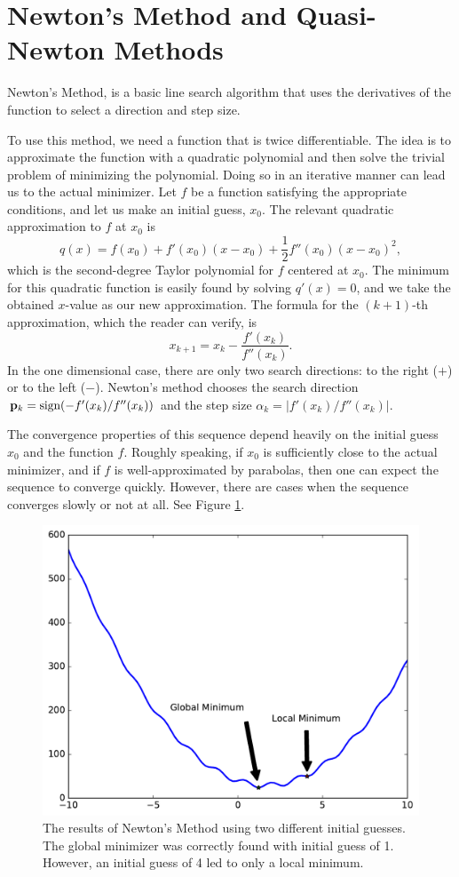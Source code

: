 \section*{Newton's Method and Quasi-Newton Methods} %

Newton's Method, is a basic line search algorithm that uses the derivatives of the function to select a direction and step size.

To use this method, we need a function that is twice differentiable.
The idea is to approximate the function with a quadratic polynomial and then solve the trivial problem of minimizing the polynomial.
Doing so in an iterative manner can lead us to the actual minimizer.
Let $f$ be a function satisfying the appropriate conditions, and let us make an initial guess, $x_0$.
The relevant quadratic approximation to $f$ at $x_0$ is
\begin{equation*}
q(x) = f(x_0) + f'(x_0)(x-x_0) + \frac{1}{2}f''(x_0)(x-x_0)^2,
\end{equation*}
which is the second-degree Taylor polynomial for $f$ centered at $x_0$.
The minimum for this quadratic function is easily found by solving $q'(x) = 0$, and we take the obtained $x$-value as our new approximation.
The formula for the $(k+1)$-th approximation, which the reader can verify, is
\begin{equation*}
x_{k+1} = x_k - \frac{f'(x_k)}{f''(x_k)}.
\end{equation*}
In the one dimensional case, there are only two search directions: to the right ($+$) or to the left ($-$).
Newton's method chooses the search direction $\mathbf{p}_k = \text{sign}(-f'(x_k)/f''(x_k))$ and the step size $\alpha_k = |f'(x_k)/f''(x_k)|$.

The convergence properties of this sequence depend heavily on the initial guess $x_0$ and the function $f$.
Roughly speaking, if $x_0$ is sufficiently close to the actual minimizer, and if $f$ is well-approximated by parabolas, then one can expect the sequence to converge quickly.
However, there are cases when the sequence converges slowly or not at all.
See Figure \ref{linesearch:newton}.

\begin{figure}
\centering
\includegraphics[width=.7\textwidth]{newton.pdf}
\caption{The results of Newton's Method using two different initial guesses.
The global minimizer was correctly found with initial guess of 1.
However, an initial guess of 4 led to only a local minimum.}
\label{linesearch:newton}
\end{figure}

